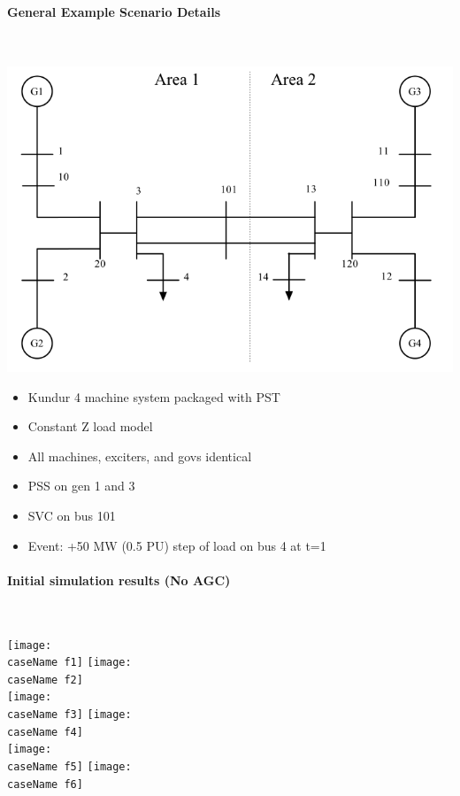 \documentclass[12pt]{article}
\begin{document}
\paragraph{General Example Scenario Details} \ \\

\begin{center}
\includegraphics[width=.75\linewidth]{sysOneLineAreas}
\end{center}
\begin{itemize}
\item Kundur  4 machine system packaged with PST
\item Constant Z load model
\item All machines, exciters, and govs identical
\item PSS on gen 1 and 3
\item SVC on bus 101
\item Event: +50 MW (0.5 PU) step of load on bus 4 at t=1
\end{itemize}

\pagebreak
\paragraph{Initial simulation results (No AGC)} \ \\


\begin{center}
\newcommand{\caseName}{NoAGC}
\texttt{[image: \\caseName f1]} %
\texttt{[image: \\caseName f2]} \\%
\texttt{[image: \\caseName f3]} %
\texttt{[image: \\caseName f4]} \\%
\texttt{[image: \\caseName f5]} %
\texttt{[image: \\caseName f6]} \\%
\end{center}
\end{document}
